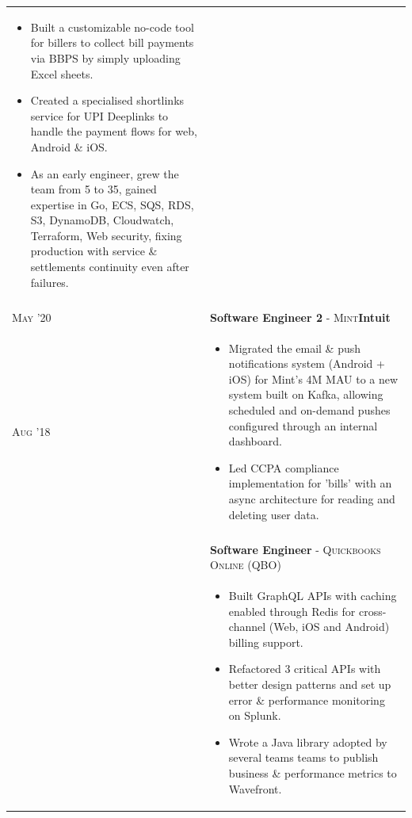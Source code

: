 \documentclass[a4paper,10pt]{extarticle} %
\begin{document}
\begin{tabularx}{\linewidth}{l | X}
\begin{itemize}[leftmargin=*, nosep, before=\vspace{-0.8\baselineskip}, after=\vspace{-1.0\baselineskip}]
  \item Built a customizable no-code tool for billers to collect bill payments via BBPS by simply uploading Excel sheets.
  \item Created a specialised shortlinks service for UPI Deeplinks to handle the payment flows for web, Android \& iOS.
  \item As an early engineer, grew the team from 5 to 35, gained expertise in Go, ECS, SQS, RDS, S3, DynamoDB, Cloudwatch, Terraform, Web security, fixing production with service \& settlements continuity even after failures.
\end{itemize}\\
\multicolumn{2}{c}{} \\

\textsc{May '20} & \textbf{Software Engineer 2} \textsc{- Mint}\hfill\raisebox{-.1\height}{ \hspace{0.3em}}\textbf{Intuit}\\
\textsc{Aug '18} & \begin{itemize}[leftmargin=*, nosep, before=\vspace{-0.8\baselineskip}, after=\vspace{-1.0\baselineskip}]
  \item Migrated the email \& push notifications system (Android + iOS) for Mint's 4M MAU to a new system built on Kafka, allowing scheduled and on-demand pushes configured through an internal dashboard.
  \item Led CCPA compliance implementation for 'bills' with an async architecture for reading and deleting user data.
\end{itemize}\\\\
& \textbf{Software Engineer} \textsc{- Quickbooks Online (QBO)}\\
& \begin{itemize}[leftmargin=*, nosep, before=\vspace{-0.8\baselineskip}, after=\vspace{-1.0\baselineskip}]
  \item Built GraphQL APIs with caching enabled through Redis for cross-channel (Web, iOS and Android) billing support.
  \item Refactored 3 critical APIs with better design patterns and set up error \& performance monitoring on Splunk.
  \item Wrote a Java library adopted by several teams teams to publish business \& performance metrics to Wavefront.

\end{itemize}
\end{tabularx}
\end{document}
